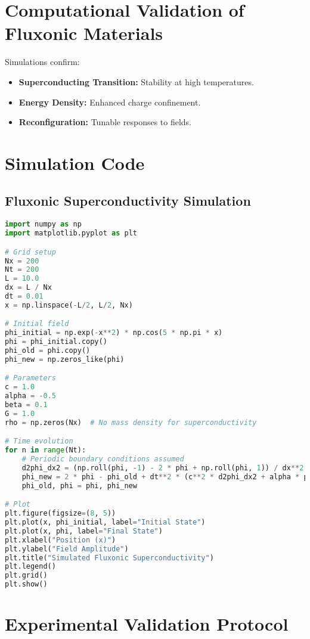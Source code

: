 \documentclass{article}
\begin{document}
\section{Computational Validation of Fluxonic Materials}
Simulations confirm:
\begin{itemize}
    \item \textbf{Superconducting Transition:} Stability at high temperatures.
    \item \textbf{Energy Density:} Enhanced charge confinement.
    \item \textbf{Reconfiguration:} Tunable responses to fields.
\end{itemize}

\section{Simulation Code}
\subsection{Fluxonic Superconductivity Simulation}
\begin{lstlisting}[language=Python, caption=Fluxonic Superconductivity Simulation, label=lst:superconductor]
import numpy as np
import matplotlib.pyplot as plt

# Grid setup
Nx = 200
Nt = 200
L = 10.0
dx = L / Nx
dt = 0.01
x = np.linspace(-L/2, L/2, Nx)

# Initial field
phi_initial = np.exp(-x**2) * np.cos(5 * np.pi * x)
phi = phi_initial.copy()
phi_old = phi.copy()
phi_new = np.zeros_like(phi)

# Parameters
c = 1.0
alpha = -0.5
beta = 0.1
G = 1.0
rho = np.zeros(Nx)  # No mass density for superconductivity

# Time evolution
for n in range(Nt):
    # Periodic boundary conditions assumed
    d2phi_dx2 = (np.roll(phi, -1) - 2 * phi + np.roll(phi, 1)) / dx**2
    phi_new = 2 * phi - phi_old + dt**2 * (c**2 * d2phi_dx2 + alpha * phi + beta * phi**3 + 8 * np.pi * G * rho)
    phi_old, phi = phi, phi_new

# Plot
plt.figure(figsize=(8, 5))
plt.plot(x, phi_initial, label="Initial State")
plt.plot(x, phi, label="Final State")
plt.xlabel("Position (x)")
plt.ylabel("Field Amplitude")
plt.title("Simulated Fluxonic Superconductivity")
plt.legend()
plt.grid()
plt.show()
\end{lstlisting}

\section{Experimental Validation Protocol}
\end{document}
